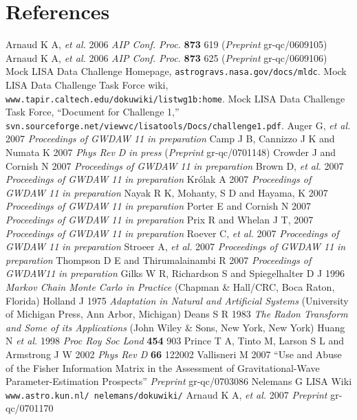 \documentclass[12pt]{iopart}
\begin{document}
\section*{References}
\begin{thebibliography}{10}
 Arnaud K A, {\it et al.} 2006 {\it AIP Conf. Proc.} {\bf 873} 619 ({\it Preprint} gr-qc/0609105)
 Arnaud K A, {\it et al.} 2006 {\it AIP Conf. Proc.} {\bf 873} 625 ({\it Preprint} gr-qc/0609106)
 Mock LISA Data Challenge Homepage, {\tt astrogravs.nasa.gov/docs/mldc}.
 Mock LISA Data Challenge Task Force wiki, {\tt www.tapir.caltech.edu/dokuwiki/listwg1b:home}.
 Mock LISA Data Challenge Task Force, ``Document for Challenge 1,'' {\tt svn.sourceforge.net/viewvc/lisatools/Docs/challenge1.pdf}.
 Auger G, {\it et al.} 2007 {\it Proceedings of GWDAW 11} {\it in preparation}
 Camp J B, Cannizzo J K and Numata K 2007 {\it Phys Rev D} {\it in press} ({\it Preprint} gr-qc/0701148)
 Crowder J and Cornish N 2007 {\it Proceedings of GWDAW 11} {\it in preparation}
 Brown D, {\it et al.} 2007 {\it Proceedings of GWDAW 11} {\it in preparation}
 Kr\'olak A 2007 {\it Proceedings of GWDAW 11} {\it in preparation}
 Nayak R K, Mohanty, S D and Hayama, K 2007 {\it Proceedings of GWDAW 11} {\it in preparation}
 Porter E and Cornish N 2007 {\it Proceedings of GWDAW 11} {\it in preparation}
 Prix R and Whelan J T, 2007 {\it Proceedings of GWDAW 11} {\it in preparation}
 Roever C, {\it et al.} 2007 {\it Proceedings of GWDAW 11} {\it in preparation}
 Stroeer A, {\it et al.} 2007 {\it Proceedings of GWDAW 11} {\it in preparation}
 Thompson D E and Thirumalainambi R 2007 {\it Proceedings of GWDAW11} {\it in preparation}
 Gilks W R, Richardson S and Spiegelhalter D J 1996 {\it Markov Chain Monte Carlo in Practice} (Chapman \& Hall/CRC, Boca Raton, Florida)
 Holland J 1975 {\it Adaptation in Natural and Artificial Systems} (University of Michigan Press, Ann Arbor, Michigan)
 Deans S R 1983 {\it The Radon Transform and Some of its Applications} (John Wiley \& Sons, New York, New York)
 Huang N {\it et al.} 1998 {\it Proc Roy Soc Lond} {\bf 454} 903
 Prince T A, Tinto M, Larson S L and Armstrong J W 2002 {\it Phys Rev D} {\bf 66} 122002
 Vallisneri M 2007 ``Use and Abuse of the Fisher Information Matrix in the Assessment of Gravitational-Wave Parameter-Estimation Prospects'' {\it Preprint} gr-qc/0703086
 Nelemans G LISA Wiki {\tt www.astro.kun.nl/~nelemans/dokuwiki/}
 Arnaud K A, {\it et al.} 2007 {\it Preprint} gr-qc/0701170

\end{thebibliography}
\end{document}
